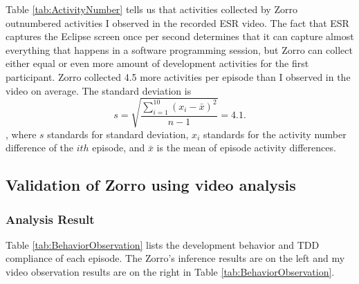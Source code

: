 Table \ref{tab:ActivityNumber} tells us that activities collected
by Zorro outnumbered activities I observed in the recorded ESR
video. The fact that ESR captures the Eclipse screen once per second
determines that it can capture almost everything that happens in a
software programming session, but Zorro can collect either equal or 
even more amount of development activities for the first participant. 
Zorro collected 4.5 more activities per episode than I observed in 
the video on average. The standard deviation is 
\begin{equation} \label{StandardDeviation}
  s = \sqrt{\frac{\sum_{i=1}^{10}{(x_{i}-\bar{x})^2}}{n-1}} = 4.1.
\end{equation},
where \begin{math}s\end{math} standards for standard deviation, 
\begin{math}x_{i}\end{math} standards for the activity number difference 
of the \begin{math}ith\end{math} episode, and \begin{math}\bar{x}\end{math} 
is the mean of episode activity differences.

\subsection{Validation of Zorro using video analysis}

\subsubsection{Analysis Result}
Table \ref{tab:BehaviorObservation} lists the development behavior
and TDD compliance of each episode. The Zorro's inference results 
are on the left and my video observation results are on the right in 
Table \ref{tab:BehaviorObservation}. 

